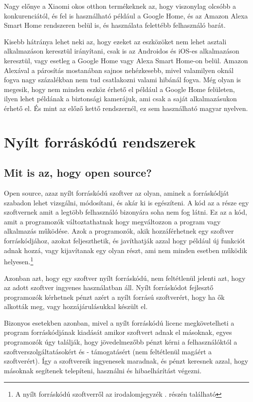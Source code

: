 \documentclass[
]{thesis-ekf}
\theoremstyle{definition}
\theoremstyle{remark}
\begin{document}
	Nagy előnye a Xiaomi okos otthon termékeknek az, hogy viszonylag olcsóbb a konkurenciától, és fel is használható például a Google Home, és az Amazon Alexa Smart Home rendszeren belül is, és használata felettébb felhasználó barát.
	
	Kisebb hátránya lehet neki az, hogy ezeket az eszközöket nem lehet asztali alkalmazáson keresztül irányítani, csak is az Androidos és iOS-es alkalmazáson keresztül, vagy esetleg a Google Home vagy Alexa Smart Home-on belül. Amazon Alexával a párosítás mostanában sajnos nehézkesebb, mivel valamilyen oknál fogva nagy százalékban nem tud csatlakozni valami hibánál fogva. Még olyan is megesik, hogy nem minden eszköz érhető el például a Google Home felületen, ilyen lehet példának a biztonsági kamerájuk, ami csak a saját alkalmazásukon érhető el. És mint az előző kettő rendszernél, ez sem használható magyar nyelven.
	
	\section{Nyílt forráskódú rendszerek}
	\subsection{Mit is az, hogy open source?}
	Open source, azaz nyílt forráskódú szoftver az olyan, aminek a forráskódját szabadon lehet vizsgálni, módosítani, és akár ki is egészíteni. A kód az a része egy szoftvernek amit a legtöbb felhasználó bizonyára soha nem fog látni. Ez az a kód, amit a programozók változtathatnak hogy megváltozzon a program vagy alkalmazás működése. Azok a programozók, akik hozzáférhetnek egy szoftver forráskódjához, azokat feljeszthetik, és javíthatják azzal hogy például új funkciót adnak hozzá, vagy kijavítanak egy olyan részt, ami nem minden esetben működik helyesen.\footnote{\label{open-source-fn}A nyílt forráskódú szoftverről az irodalomjegyzék \cite{what-is-open-source}. részén található}
	
	Azonban azt, hogy egy szoftver nyílt forráskódú, nem feltétlenül jelenti azt, hogy az adott szoftver ingyenes használatban áll. Nyílt forráskódot fejlesztő programozók kérhetnek pénzt azért a nyílt forrású szoftverért, hogy ha ők alkották meg, vagy hozzájárulásukkal készült el. 
	
	Bizonyos esetekben azonban, mivel a nyílt forráskódú licenc megkövetelheti a program forráskódjának kiadását amikor szoftvert adnak el másoknak, egyes programozók úgy találják, hogy jövedelmezőbb pénzt kérni a felhasználóktól a szoftverszolgáltatásokért és - támogatásért (nem feltétlenül magáért a szoftverért). Így a szoftvereik ingyenesek maradnak, és pénzt keresnek azzal, hogy másoknak segítenek telepíteni, használni és hibaelhárítást végezni.
	
\end{document}

